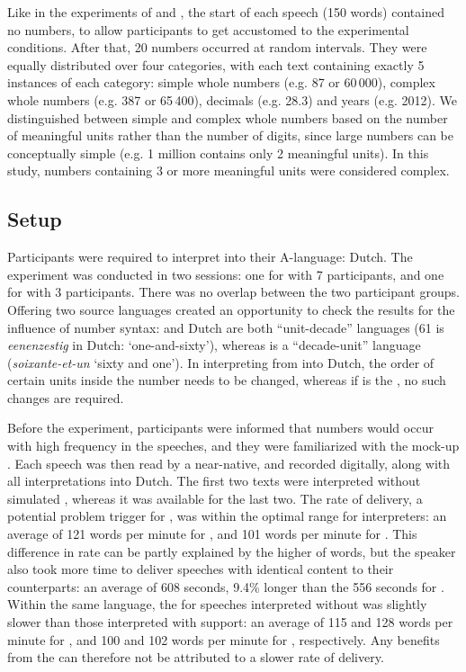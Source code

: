 \documentclass[output=paper]{langsci/langscibook}
\begin{document}
Like in the experiments of \citet{Braun1996} and \citet{Mazza2001}, the start of each speech (150 words) contained no numbers, to allow participants to get accustomed to the experimental conditions. After that, 20 numbers occurred at random intervals. They were equally distributed over four categories, with each text containing exactly 5 instances of each category: simple whole numbers (e.g. 87 or 60\,000), complex whole numbers (e.g. 387 or 65\,400), decimals (e.g. 28.3) and years (e.g. 2012). We distinguished between simple and complex whole numbers based on the number of meaningful units rather than the number of digits, since large numbers can be conceptually simple (e.g. 1 million contains only 2 meaningful units). In this study, numbers containing 3 or more meaningful units were considered complex.

\subsection{Setup}
Participants were required to interpret into their A-language: Dutch. The experiment was conducted in two sessions: one for  with 7 participants, and one for  with 3 participants. There was no overlap between the two participant groups. Offering two source languages created an opportunity to check the results for the influence of number syntax:  and Dutch are both “unit-decade” languages (61 is \textit{eenenzestig} in Dutch: ‘one-and-sixty’), whereas  is a “decade-unit” language (\textit{soixante-et-un} ‘sixty and one’). In interpreting from  into Dutch, the order of certain units inside the number needs to be changed, whereas if  is the , no such changes are required.

Before the experiment, participants were informed that numbers would occur with high frequency in the speeches, and they were familiarized with the mock-up . Each speech was then read by a near-native, and recorded digitally, along with all interpretations into Dutch. The first two texts were interpreted without simulated , whereas it was available for the last two. The rate of delivery, a potential problem trigger for  \citep{Gile1995}, was within the optimal range for interpreters: an average of 121 words per minute for , and 101 words per minute for . This difference in rate can be partly explained by the higher  of  words, but the  speaker also took more time to deliver speeches with identical content to their  counterparts: an average of 608 seconds, 9.4\% longer than the 556 seconds for . Within the same language, the  for speeches interpreted without  was slightly slower than those interpreted with support: an average of 115 and 128 words per minute for , and 100 and 102 words per minute for , respectively. Any benefits from the  can therefore not be attributed to a slower rate of delivery.\largerpage
\end{document}
